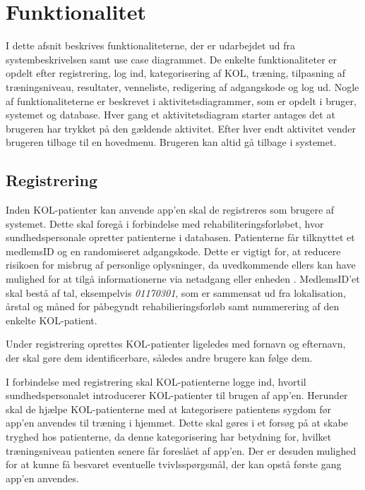 \section{Funktionalitet}
I dette afsnit beskrives funktionaliteterne, der er udarbejdet ud fra systembeskrivelsen samt use case diagrammet. De enkelte funktionaliteter er opdelt efter registrering, log ind, kategorisering af KOL, træning, tilpasning af træningsniveau, resultater, venneliste, redigering af adgangskode og log ud. Nogle af funktionaliteterne er beskrevet i aktivitetsdiagrammer, som er opdelt i bruger, systemet og database. Hver gang et aktivitetsdiagram starter antages det at brugeren har trykket på den gældende aktivitet. Efter hver endt aktivitet vender brugeren tilbage til en hovedmenu. Brugeren kan altid gå tilbage i systemet.

\subsection*{Registrering} \label{sec:registrering}
Inden KOL-patienter kan anvende app'en skal de registreres som brugere af systemet. Dette skal foregå i forbindelse med rehabiliteringsforløbet, hvor sundhedspersonale opretter patienterne i databasen. Patienterne får tilknyttet et medlemsID og en randomiseret adgangskode. Dette er vigtigt for, at reducere risikoen for misbrug af personlige oplysninger, da uvedkommende ellers kan have mulighed for at tilgå informationerne via netadgang eller enheden \cite{Sundhedsdatastyrelsen2016}. MedlemsID'et skal bestå af tal, eksempelvis \textit{01170301}, som er sammensat ud fra lokalisation, årstal og måned for påbegyndt rehabilieringsforløb samt nummerering af den enkelte KOL-patient.

Under registrering oprettes KOL-patienter ligeledes med fornavn og efternavn, der skal gøre dem identificerbare, således andre brugere kan følge dem. 

I forbindelse med registrering skal KOL-patienterne logge ind, hvortil sundhedspersonalet introducerer KOL-patienter til brugen af app'en. Herunder skal de hjælpe KOL-patienterne med at kategorisere patientens sygdom før app'en anvendes til træning i hjemmet. Dette skal gøres i et forsøg på at skabe tryghed hos patienterne, da denne kategorisering har betydning for, hvilket træningsniveau patienten senere får foreslået af app'en. Der er desuden mulighed for at kunne få besvaret eventuelle tvivlsspørgsmål, der kan opstå første gang app'en anvendes. 


